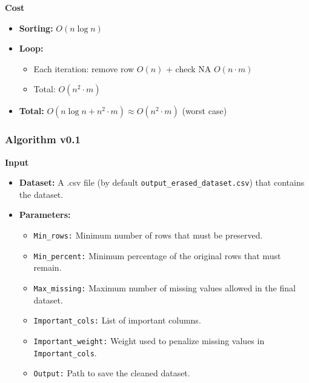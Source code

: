 \documentclass[a4paper,12pt]{article}
\begin{document}
\textbf{Cost}
\begin{itemize}
    \item \textbf{Sorting:} $O(n \log n)$
    \item \textbf{Loop:} 
        \begin{itemize}
            \item Each iteration: remove row $O(n)$ + check NA $O(n \cdot m)$
            \item Total: $O(n^2 \cdot m)$
        \end{itemize}
    \item \textbf{Total:} $O(n \log n + n^2 \cdot m) \approx O(n^2 \cdot m)$ (worst case)
\end{itemize}

\subsubsection{Algorithm v0.1}
\textbf{Input}
\begin{itemize}
    \item \textbf{Dataset:} A .csv file (by default \texttt{output\_erased\_dataset.csv}) that contains the dataset.
    \item \textbf{Parameters:}
    \begin{itemize}
        \item \texttt{Min\_rows:} Minimum number of rows that must be preserved.
        \item \texttt{Min\_percent:} Minimum percentage of the original rows that must remain.
        \item \texttt{Max\_missing:} Maximum number of missing values allowed in the final dataset.
        \item \texttt{Important\_cols:} List of important columns.
        \item \texttt{Important\_weight:} Weight used to penalize missing values in \texttt{Important\_cols}.
        \item \texttt{Output:} Path to save the cleaned dataset.
    \end{itemize}
\end{itemize}
\end{document}
